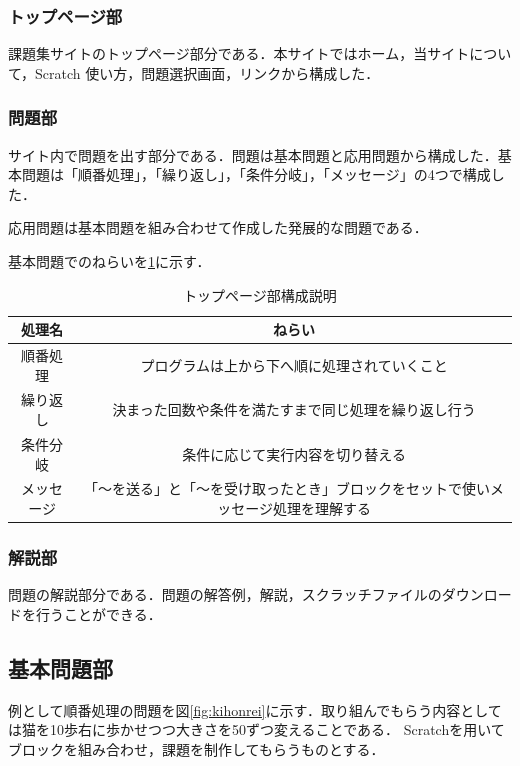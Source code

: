 \subsubsection{トップページ部}
課題集サイトのトップページ部分である．本サイトではホーム，当サイトについて，Scratch 使い方，問題選択画面，リンクから構成した．

\subsubsection{問題部}
サイト内で問題を出す部分である．問題は基本問題と応用問題から構成した．基本問題は「順番処理」，「繰り返し」，「条件分岐」，「メッセージ」の4つで構成した．

応用問題は基本問題を組み合わせて作成した発展的な問題である．

基本問題でのねらいを\ref{tab:nerai}に示す．
\begin{table}[htb]
\begin{center}
    \caption{トップページ部構成説明}
  \begin{tabular}{|c|c|} \hline
     処理名  & ねらい  \\ \hline
     順番処理& プログラムは上から下へ順に処理されていくこと \\ \hline
     繰り返し& 決まった回数や条件を満たすまで同じ処理を繰り返し行う \\ \hline
     条件分岐& 条件に応じて実行内容を切り替える \\ \hline
     メッセージ& 「〜を送る」と「〜を受け取ったとき」ブロックをセットで使いメッセージ処理を理解する \\ \hline
  \end{tabular}
  \label{tab:nerai}
  \end{center}
\end{table}
\subsubsection{解説部}
問題の解説部分である．問題の解答例，解説，スクラッチファイルのダウンロードを行うことができる．
\newpage

\subsection{基本問題部}
例として順番処理の問題を図\ref{fig:kihonrei}に示す．取り組んでもらう内容としては猫を10歩右に歩かせつつ大きさを50ずつ変えることである．
Scratchを用いてブロックを組み合わせ，課題を制作してもらうものとする．


